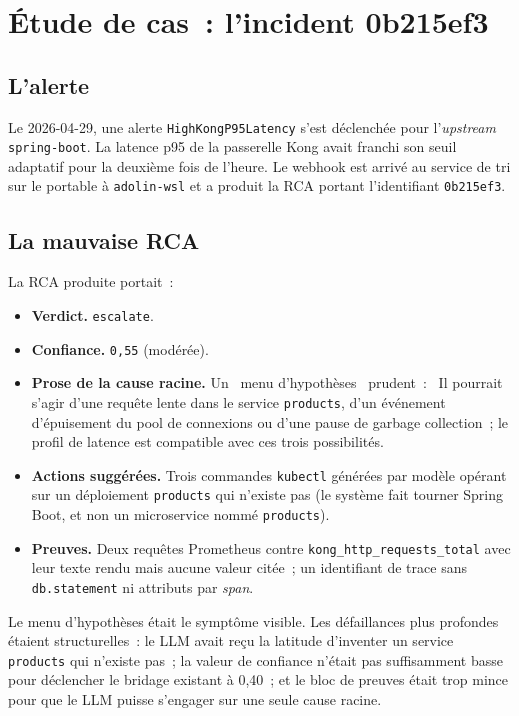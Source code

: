 \documentclass[11pt,a4paper,oneside]{report}
\begin{document}
\chapter{Étude de cas~: l'incident 0b215ef3}
\label{ch:case-study}

\section{L'alerte}

Le 2026-04-29, une alerte \texttt{HighKongP95Latency} s'est
déclenchée pour l'\emph{upstream} \texttt{spring-boot}. La latence
p95 de la passerelle Kong avait franchi son seuil adaptatif pour la
deuxième fois de l'heure. Le webhook est arrivé au service de tri
sur le portable à \texttt{adolin-wsl} et a produit la RCA portant
l'identifiant \texttt{0b215ef3}.

\section{La mauvaise RCA}

La RCA produite portait~:

\begin{itemize}
  \item \textbf{Verdict.} \texttt{escalate}.
  \item \textbf{Confiance.} \texttt{0,55} (modérée).
  \item \textbf{Prose de la cause racine.} Un \og~menu d'hypothèses~\fg{}
        prudent~: \og~Il pourrait s'agir d'une requête lente dans
        le service \texttt{products}, d'un événement d'épuisement
        du pool de connexions ou d'une pause de garbage
        collection~; le profil de latence est compatible avec ces
        trois possibilités.~\fg{}
  \item \textbf{Actions suggérées.} Trois commandes
        \texttt{kubectl} générées par modèle opérant sur un
        déploiement \texttt{products} qui n'existe pas (le système
        fait tourner Spring Boot, et non un microservice nommé
        \texttt{products}).
  \item \textbf{Preuves.} Deux requêtes Prometheus contre
        \texttt{kong\_http\_requests\_total} avec leur texte rendu
        mais aucune valeur citée~; un identifiant de trace sans
        \texttt{db.statement} ni attributs par \emph{span}.
\end{itemize}

\begin{warnbox}[title={Pourquoi l'opérateur l'a attrapée}]
Le menu d'hypothèses était le symptôme visible. Les défaillances
plus profondes étaient structurelles~: le LLM avait reçu la
latitude d'inventer un service \texttt{products} qui n'existe pas~;
la valeur de confiance n'était pas suffisamment basse pour
déclencher le bridage existant à 0,40~; et le bloc de preuves était
trop mince pour que le LLM puisse s'engager sur une seule cause
racine.
\end{warnbox}
\end{document}
